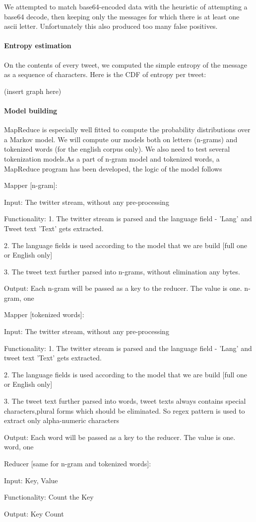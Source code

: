 \documentclass[a4paper,11pt]{article}
\begin{document}
We attempted to match base64-encoded data with the heuristic of attempting a base64 decode, then keeping only the messages for which there is at least one ascii letter. Unfortunately this also produced too many false positives.


\paragraph{Entropy estimation}

On the contents of every tweet, we computed the simple entropy of the message as a sequence of characters. Here is the CDF of entropy per tweet:

(insert graph here)

\paragraph{Model building}

MapReduce is especially well fitted to compute the probability distributions over a Markov model. We will compute our models both on letters (n-grams) and tokenized words (for the english corpus only). We also need to test several tokenization models.As a part of n-gram model and tokenized words, a MapReduce program has been developed, the logic of the model follows
\begin{flushleft}

Mapper [n-gram]:

Input: The twitter stream, without any pre-processing

Functionality:  1. The twitter stream is parsed and the language field - 'Lang' 					and Tweet text 'Text' gets extracted.

				2. The language fields is used according to the model that we are 					build [full one or English only]

				3. The tweet text further parsed into n-grams, without elimination 				any bytes.

Output: Each n-gram will be passed as a key to the reducer. The value is one. 
		{n-gram, one}

Mapper [tokenized words]:

Input: The twitter stream, without any pre-processing

Functionality:	1. The twitter stream is parsed and the language field - 'Lang' 					and tweet text 'Text' gets extracted.

				2. The language fields is used according to the model that we are 					build [full one or English only]
				
				3. The tweet text further parsed into words, tweet texts always 					contains special characters,plural forms which should be 							eliminated. So regex pattern is used to extract only alpha-numeric 				characters 

Output: Each word will be passed as a key to the reducer. The value is one. 
		{word, one}
				
Reducer [same for n-gram and tokenized words]:

Input: {Key, Value}

Functionality: Count the Key

Output: Key Count 
\end{flushleft}
\end{document}
